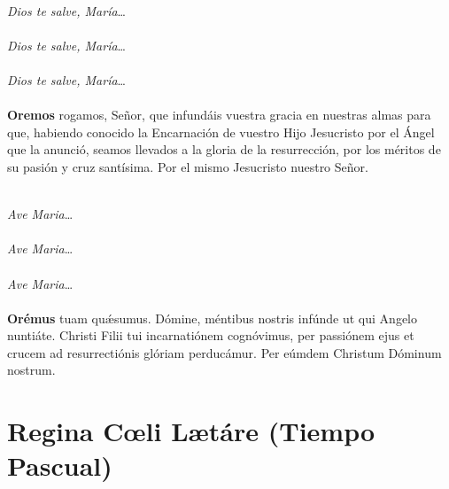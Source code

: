 \documentclass[10pt,a4paper,oneside]{book}
\begin{document}
\begin{minipage}[t]{0.475\textwidth}
      \\[1mm]
      \textit{Dios te salve, María}\ldots\\[1mm]
      \\[1mm]
      \textit{Dios te salve, María}\ldots\\[1mm]
      \\[1mm]
      \textit{Dios te salve, María}\ldots\\[1mm]
      \ruegapornosotrossalve\\[2mm]
      \textbf{Oremos}
       rogamos, Señor, que infundáis vuestra gracia en nuestras almas para que,
      habiendo conocido la Encarnación de vuestro Hijo Jesucristo por el Ángel que la anunció,
      seamos llevados a la gloria de la resurrección, por los méritos de su pasión y cruz santísima.
      Por el mismo Jesucristo nuestro Señor.\\[1mm]
\end{minipage}
\begin{minipage}[t]{0.475\textwidth}
      \\[1mm]
      \textit{Ave Maria}\ldots\\[1mm]
      \\[1mm]
      \textit{Ave Maria}\ldots\\[1mm]
      \\[1mm]
      \textit{Ave Maria}\ldots\\[1mm]
      \orapronobissalve\\[2mm]
      \textbf{Orémus}
       tuam qu{\'\ae}sumus. Dómine, méntibus nostris infúnde ut qui Angelo nuntiáte.
      Christi Filii tui incarnatiónem cognóvimus, per passiónem ejus et crucem ad resurrectiónis glóriam perducámur.
      Per eúmdem Christum Dóminum nostrum.\\[1mm]
\end{minipage}

\section*{Regina C{\oe}li L{\ae}táre (Tiempo Pascual)}
\end{document}
